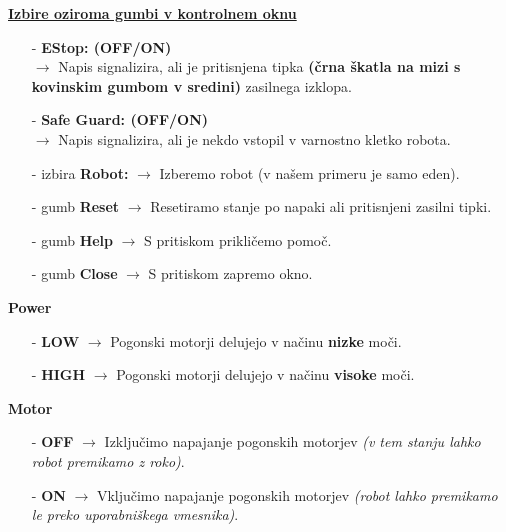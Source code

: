\noindent %
\textbf{\underline{Izbire oziroma gumbi  v kontrolnem oknu}} %
\\
\begin{enumerate}
    \item[-] \textbf{EStop: (OFF/ON)} \\%
        \hspace*{1.0cm}    $\longrightarrow$ Napis signalizira, ali je pritisnjena tipka \textbf{(črna škatla na mizi s \\%
        \hspace*{1.7cm}    kovinskim gumbom v sredini)} zasilnega izklopa. %
    \item[-] \textbf{Safe Guard: (OFF/ON)} \\%
        \hspace*{1.0cm}    $\longrightarrow$ Napis signalizira, ali je nekdo vstopil v varnostno kletko robota. %
    \item[-] izbira \textbf{Robot:} $\longrightarrow$ Izberemo robot (v našem primeru je samo eden). %
    \item[-] gumb \textbf{Reset} $\longrightarrow$ Resetiramo stanje po napaki ali pritisnjeni zasilni tipki. %
    \item[-] gumb \textbf{Help} $\longrightarrow$ S pritiskom prikličemo pomoč. %
    \item[-] gumb \textbf{Close} $\longrightarrow$ S pritiskom zapremo okno. %
\end{enumerate}

\noindent %
\textbf{Power}
\begin{enumerate}
    \item[-] \textbf{LOW} $\longrightarrow$ Pogonski motorji delujejo v načinu \textbf{nizke} moči. %
    \item[-] \textbf{HIGH} $\longrightarrow$ Pogonski motorji delujejo v načinu \textbf{visoke} moči. %
\end{enumerate}

\noindent %
\textbf{Motor}
\begin{enumerate}
    \item[-] \textbf{OFF} $\longrightarrow$ Izključimo napajanje pogonskih motorjev \emph{(v tem stanju lahko \\%
        \hspace*{1.5cm}    robot premikamo z roko)}. %
    \item[-] \textbf{ON} $\longrightarrow$ Vključimo napajanje pogonskih motorjev \emph{(robot lahko premikamo \\%
        \hspace*{1.3cm}    le preko uporabniškega vmesnika)}. %
\end{enumerate}



